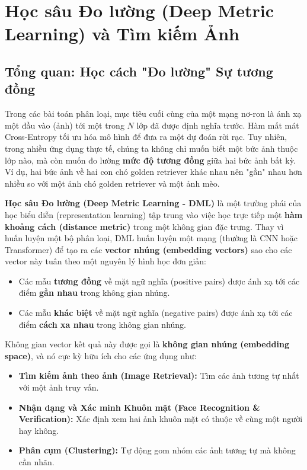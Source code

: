 \section{Học sâu Đo lường (Deep Metric Learning) và Tìm kiếm Ảnh}
\label{sec:deep_metric_learning}

\subsection{Tổng quan: Học cách "Đo lường" Sự tương đồng}
\label{subsec:dml_overview}
Trong các bài toán phân loại, mục tiêu cuối cùng của một mạng nơ-ron là ánh xạ một đầu vào (ảnh) tới một trong $N$ lớp đã được định nghĩa trước. Hàm mất mát Cross-Entropy tối ưu hóa mô hình để đưa ra một dự đoán rời rạc. Tuy nhiên, trong nhiều ứng dụng thực tế, chúng ta không chỉ muốn biết một bức ảnh thuộc lớp nào, mà còn muốn đo lường \textbf{mức độ tương đồng} giữa hai bức ảnh bất kỳ. Ví dụ, hai bức ảnh về hai con chó golden retriever khác nhau nên "gần" nhau hơn nhiều so với một ảnh chó golden retriever và một ảnh mèo.

\textbf{Học sâu Đo lường (Deep Metric Learning - DML)} là một trường phái của học biểu diễn (representation learning) tập trung vào việc học trực tiếp một \textbf{hàm khoảng cách (distance metric)} trong một không gian đặc trưng. Thay vì huấn luyện một bộ phân loại, DML huấn luyện một mạng (thường là CNN hoặc Transformer) để tạo ra các \textbf{vector nhúng (embedding vectors)} sao cho các vector này tuân theo một nguyên lý hình học đơn giản:
\begin{itemize}
	\item Các mẫu \textbf{tương đồng} về mặt ngữ nghĩa (positive pairs) được ánh xạ tới các điểm \textbf{gần nhau} trong không gian nhúng.
	\item Các mẫu \textbf{khác biệt} về mặt ngữ nghĩa (negative pairs) được ánh xạ tới các điểm \textbf{cách xa nhau} trong không gian nhúng.
\end{itemize}

Không gian vector kết quả này được gọi là \textbf{không gian nhúng (embedding space)}, và nó cực kỳ hữu ích cho các ứng dụng như:
\begin{itemize}
	\item \textbf{Tìm kiếm ảnh theo ảnh (Image Retrieval):} Tìm các ảnh tương tự nhất với một ảnh truy vấn.
	\item \textbf{Nhận dạng và Xác minh Khuôn mặt (Face Recognition \& Verification):} Xác định xem hai ảnh khuôn mặt có thuộc về cùng một người hay không.
	\item \textbf{Phân cụm (Clustering):} Tự động gom nhóm các ảnh tương tự mà không cần nhãn.
\end{itemize}

